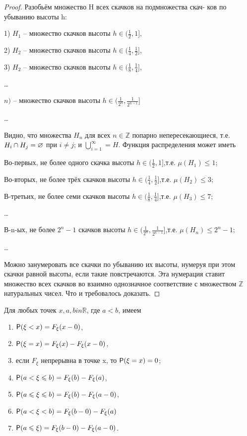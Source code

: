\begin{proof}
	Разобьём множество H всех скачков на подмножества скач-
ков по убыванию высоты h:
	
	1) $H_1$ – множество скачков высоты $h\in(\frac{1}{2},1]$,

	2)  $H_2$ – множество скачков высоты $h\in(\frac{1}{4},\frac{1}{2}]$,

	3) $H_2$ – множество скачков высоты $h\in(\frac{1}{8},\frac{1}{4}]$,

	\dots

	$n)$ – множество скачков высоты $h\in(\frac{1}{2^n},\frac{1}{2^{n-1}}]$

	\dots



Видно, что множества $H_n$ для всех $n\in\mathbb{Z}$ попарно непересекающиеся, т.е.
$H_i \cap H_j=\O$  при $i\neq j$; и $\bigcup\limits_{i=1}^{\infty}=H$.
Функция распределения может иметь

Во-первых, 	не более одного  скачка высоты $h\in(\frac{1}{2},1]$,т.е. 
$\mu(H_1)\leqslant 1$;

Во-вторых, 	не более трёх  скачков высоты $h\in(\frac{1}{4},\frac{1}{2}]$,т.е. 
$\mu(H_2)\leqslant 3$;

В-третьих, 	не более семи  скачков высоты $h\in(\frac{1}{8},\frac{1}{4}]$,т.е. 
$\mu(H_3)\leqslant 7$;

\ldots

В-n-ых, не более $2^n-1$ скачков высоты $h\in(\frac{1}{2^n},\frac{1}{2^{n-1}}]$,т.е.
$\mu(H_n)\leqslant 2^n-1$;

\ldots

Можно занумеровать все скачки по убыванию их высоты, нумеруя при
этом скачки равной высоты, если такие повстречаются. Эта нумерация ставит
множество всех скачков во взаимно однозначное соответствие с множеством
$\mathbb{Z}$ натуральных чисел. Что и требовалось доказать.

\end{proof}

\begin{theorem}
\label{th:11.6}
	Для любых точек $x,a,bin\mathbb{R}$, где $a<b$, имеем 
	\newline
	\begin{enumerate}
		\item $\P(\xi<x)=F_{\xi}(x-0)$,
		\item $\P(\xi=x)=F_{\xi}(x)-F_{\xi}(x-0)$,
		\item если $F_{\xi}$ непрерывна в точке x, то $\P(\xi = x) = 0$;
		\item  $\P(a<\xi\leqslant b)=F_{\xi}(b)-F_{\xi}(a)$,
		\item $\P(a\leqslant\xi\leqslant b)=F_{\xi}(b)-F_{\xi}(a-0)$,
		\item $\P(a<\xi<b)=F_{\xi}(b-0)-F_{\xi}(a)$
		\item $\P(a\leqslant\xi)=F_{\xi}(b-0)-F_{\xi}(a-0)$.
	\end{enumerate}
\end{theorem}

